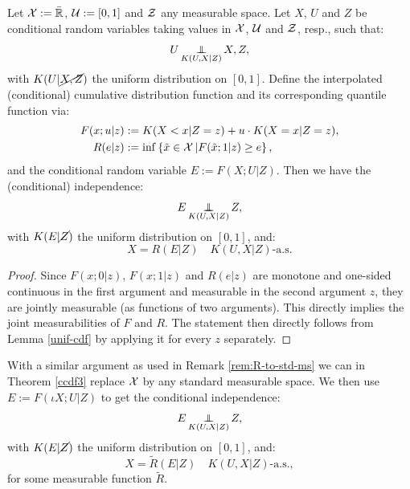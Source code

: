 \begin{Thm}
    \label{ccdf3}
    Let $\mathcal{X}:=\bar {\mathbb{R}}$, $\mathcal{U}:=[0,1]$ and $\mathcal{Z}$ any measurable space.
    Let $X$, $U$ and $Z$ be conditional random variables taking values in $\mathcal{X}$, $\mathcal{U}$ and $\mathcal{Z}$, resp.,
    such that:
    \[ U \operatorname*{\perp\mkern-11mu\perp}_{K(U,X|Z)} X,Z,  \]
    with $K(U|\cancel{X,Z})$ the uniform distribution on $[0,1]$.
    Define the interpolated (conditional) cumulative distribution function and its corresponding quantile function via:
\begin{align*}
    F(x;u|z) &:= K(X<x|Z=z) + u \cdot K(X=x|Z=z),\\
	R(e|z) &:= \inf \left\{ \tilde{x} \in \mathcal{X}\,| F(\tilde{x};1|z) \ge e \right\},
\end{align*}
    and the conditional random variable $E := F(X;U|Z)$.
    Then we have the (conditional) independence:
    \[ E \operatorname*{\perp\mkern-11mu\perp}_{K(U,X|Z)} Z, \]
    with $K(E|\cancel{Z})$ the uniform distribution on $[0,1]$, and:
    \[ X = R(E|Z) \quad K(U,X|Z)\text{-a.s.}\]
    \begin{proof}
        Since $F(x;0|z)$, $F(x;1|z)$ and $R(e|z)$ are monotone and one-sided continuous in the first argument and measurable in the second argument $z$, they are jointly measurable (as functions of two arguments).
        This directly implies the joint measurabilities of $F$ and $R$. 
        The statement then directly follows from Lemma \ref{unif-cdf} by applying it for every $z$ separately.
    \end{proof}
\end{Thm}

\begin{Rem}
    With a similar argument as used in Remark \ref{rem:R-to-std-ms} we can in Theorem \ref{ccdf3} replace $\mathcal{X}$ 
    by any standard measurable space. We then use $E := F(\iota X;U|Z)$ to get 
    the conditional independence:
    \[ E \operatorname*{\perp\mkern-11mu\perp}_{K(U,X|Z)} Z, \]
    with $K(E|\cancel{Z})$ the uniform distribution on $[0,1]$, and:
    \[ X = \tilde R(E|Z) \quad K(U,X|Z)\text{-a.s.},\]
    for some measurable function $\tilde R$.
\end{Rem}

